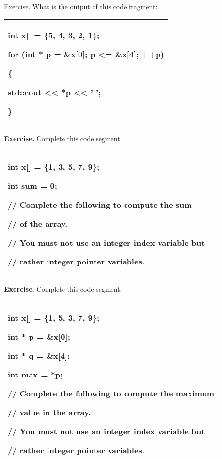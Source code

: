 \documentclass[
]{article}
\begin{document}
Exercise. What is the output of this code fragment:

\begin{longtable}[]{@{}l@{}}
\toprule
\endhead
\begin{minipage}[t]{0.97\columnwidth}\raggedright
int x{[}{]} = \{5, 4, 3, 2, 1\};

for (int * p = \&x{[}0{]}; p \textless= \&x{[}4{]}; ++p)

\{

std::cout \textless\textless{} *p \textless\textless{} ' ';

\}\strut
\end{minipage}\tabularnewline
\bottomrule
\end{longtable}

\textbf{Exercise.} Complete this code segment.

\begin{longtable}[]{@{}l@{}}
\toprule
\endhead
\begin{minipage}[t]{0.97\columnwidth}\raggedright
int x{[}{]} = \{1, 3, 5, 7, 9\};

int sum = 0;

// Complete the following to compute the sum

// of the array.

// You must not use an integer index variable but

// rather integer pointer variables.\strut
\end{minipage}\tabularnewline
\bottomrule
\end{longtable}

\textbf{Exercise.} Complete this code segment.

\begin{longtable}[]{@{}l@{}}
\toprule
\endhead
\begin{minipage}[t]{0.97\columnwidth}\raggedright
int x{[}{]} = \{1, 5, 3, 7, 9\};

int * p = \&x{[}0{]};

int * q = \&x{[}4{]};

int max = *p;

// Complete the following to compute the maximum

// value in the array.

// You must not use an integer index variable but

// rather integer pointer variables.\strut
\end{minipage}\tabularnewline
\bottomrule
\end{longtable}
\end{document}
